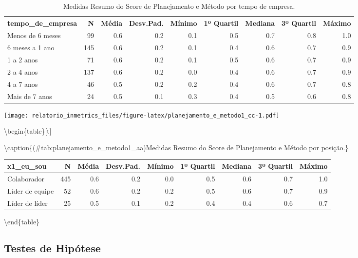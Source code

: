 \documentclass[]{book}
\begin{document}
\begin{table}[t]

\caption{\label{tab:unnamed-chunk-21}Medidas Resumo do Score de Planejamento e Método por tempo de empresa.}
\centering
\fontsize{7}{9}\selectfont
\begin{tabular}{lrrrrrrrr}
\toprule
tempo\_de\_empresa & N & Média & Desv.Pad. & Mínimo & 1º Quartil & Mediana & 3º Quartil & Máximo\\
\midrule
Menos de 6 meses & 99 & 0.6 & 0.2 & 0.1 & 0.5 & 0.7 & 0.8 & 1.0\\
6 meses a 1 ano & 145 & 0.6 & 0.2 & 0.1 & 0.4 & 0.6 & 0.7 & 0.9\\
1 a 2 anos & 71 & 0.6 & 0.2 & 0.1 & 0.5 & 0.6 & 0.7 & 0.9\\
2 a 4 anos & 137 & 0.6 & 0.2 & 0.0 & 0.4 & 0.6 & 0.7 & 0.9\\
4 a 7 anos & 46 & 0.5 & 0.2 & 0.2 & 0.4 & 0.6 & 0.7 & 0.8\\
\addlinespace
Mais de 7 anos & 24 & 0.5 & 0.1 & 0.3 & 0.4 & 0.5 & 0.6 & 0.8\\
\bottomrule
\end{tabular}
\end{table}

\texttt{[image: relatorio\_inmetrics\_files/figure-latex/planejamento\_e\_metodo1\_cc-1.pdf]}

\textbackslash{}begin\{table\}{[}t{]}

\textbackslash{}caption\{(\#tab:planejamento\_e\_metodo1\_aa)Medidas Resumo do Score de Planejamento e Método por posição.\}
\centering
\fontsize{7}{9}\selectfont

\begin{tabular}{lrrrrrrrr}
\toprule
x1\_eu\_sou & N & Média & Desv.Pad. & Mínimo & 1º Quartil & Mediana & 3º Quartil & Máximo\\
\midrule
Colaborador & 445 & 0.6 & 0.2 & 0.0 & 0.5 & 0.6 & 0.7 & 1.0\\
Líder de equipe & 52 & 0.6 & 0.2 & 0.2 & 0.5 & 0.6 & 0.7 & 0.9\\
Líder de líder & 25 & 0.5 & 0.1 & 0.2 & 0.4 & 0.4 & 0.6 & 0.7\\
\bottomrule
\end{tabular}

\textbackslash{}end\{table\}

\pagebreak

\hypertarget{testes-de-hipotese-5}{%
\subsection{Testes de Hipótese}\label{testes-de-hipotese-5}}
\end{document}
